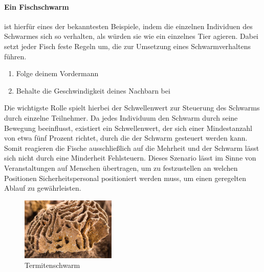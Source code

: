 \paragraph{Ein Fischschwarm}
ist hierfür eines der bekanntesten Beispiele, indem die einzelnen Individuen des Schwarmes sich so verhalten, als würden sie wie ein einzelnes Tier agieren. Dabei setzt jeder Fisch feste Regeln um, die zur Umsetzung eines Schwarmverhaltens führen.%
\begin{enumerate}
	\item Folge deinem Vordermann
	\item Behalte die Geschwindigkeit deines Nachbarn bei
\end{enumerate}
\noindent
Die wichtigste Rolle spielt hierbei der Schwellenwert zur Steuerung des Schwarms durch einzelne Teilnehmer. Da jedes Individuum den Schwarm durch seine Bewegung beeinflusst, existiert ein Schwellenwert, der sich einer Mindestanzahl von etwa fünf Prozent richtet, durch die der Schwarm gesteuert werden kann. Somit reagieren die Fische ausschließlich auf die Mehrheit und der Schwarm lässt sich nicht durch eine Minderheit Fehlsteuern. Dieses Szenario lässt im Sinne von Veranstaltungen auf Menschen übertragen, um zu festzustellen an welchen Positionen Sicherheitspersonal positioniert werden muss, um einen geregelten Ablauf zu gewährleisten.%
\begin{figure}
	\begin{center}
		\includegraphics[width=0.4\textwidth]{images/technische_grundlagen/termitenschwarm.jpg}
	\end{center}
	\caption{Termitenschwarm}
	\label{fig:termitenschwarm}
\end{figure}

\noindent
